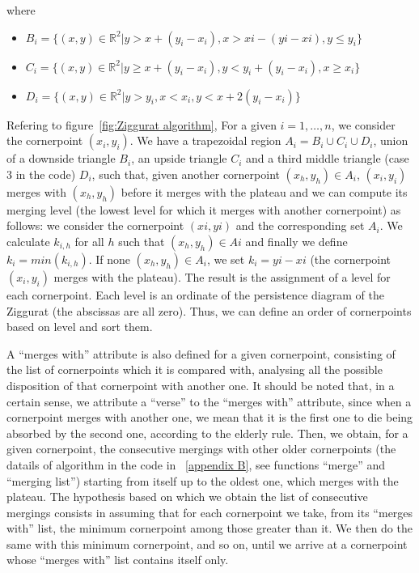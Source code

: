 \documentclass[english, LaM, oneside, noexaminfo]{sapthesis}
\begin{document}
where

\begin{itemize}
    \item $B_i = \{(x, y) \in \mathbb{R}^2 | y > x + (y_i - x_i), x > xi - (yi - xi), y \leq y_i\}$
    \item $C_i = \{(x, y) \in \mathbb{R}^2 | y \geq x + (y_i - x_i),  y < y_i + (y_i - x_i), x \geq x_i\}$
    \item $D_i = \{(x, y) \in \mathbb{R}^2 | y > y_i,  x < x_i, y < x + 2(y_i - x_i)\}$
\end{itemize}

\noindent Refering to figure~\ref{fig:Ziggurat algorithm}, For a given $i = 1, \dots, n$, we consider the cornerpoint $(x_i,y_i)$. We have a trapezoidal region $A_i = B_i \cup C_i \cup D_i $, union of a downside triangle $B_i$, an upside triangle $C_i$ and a third middle triangle (case 3 in the code) $D_i$, such that, given another cornerpoint $(x_h, y_h) \in A_i$, $(x_i, y_i)$ merges with $(x_h,y_h)$ before it merges with the plateau and we can compute its merging level (the lowest level for which it merges with another cornerpoint) as follows:  we consider the cornerpoint $(xi, yi)$ and the corresponding set $A_i$. We calculate $k_{i, h}$ for all $h$ such that $(x_h, y_h) \in Ai$ and finally we define $k_i = min(k_{i, h})$. If none $(x_h, y_h) \in A_i$, we set $k_i = yi - xi$ (the cornerpoint $(x_i, y_i)$ merges with the plateau). The result is the assignment of a level for each cornerpoint. Each level is an ordinate of the persistence diagram of the Ziggurat (the abscissas are all zero).
Thus, we can define an order of cornerpoints based on level and sort them.

\noindent A ``merges with'' attribute is also defined for a given cornerpoint, consisting of the list of cornerpoints which it is compared with, analysing all the possible disposition of that cornerpoint with another one.
\noindent It should be noted that, in a certain sense, we attribute a ``verse'' to the ``merges with'' attribute, since when a cornerpoint merges with another one, we mean that it is the first one to die being absorbed by the second one, according to the elderly rule.
Then, we obtain, for a given cornerpoint, the consecutive mergings with other older cornerpoints (the datails of algorithm in the code in ~\ref{appendix B}, see functions ``merge'' and ``merging list'') starting from itself up to the oldest one, which merges with the plateau. The hypothesis based on which we obtain the list of consecutive mergings consists in assuming that for each cornerpoint we take, from its ``merges with'' list, the minimum cornerpoint among those greater than it. We then do the same with this minimum cornerpoint, and so on, until we arrive at a cornerpoint whose ``merges with'' list contains itself only.
\end{document}
